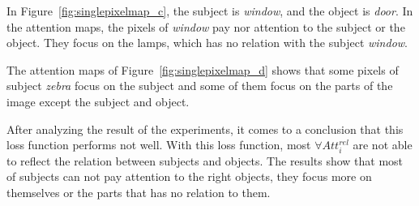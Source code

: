 In Figure~\ref{fig:singlepixelmap_c}, the subject is \textit{window}, and the object is \textit{door}. In the attention maps, the pixels of  \textit{window} pay nor attention to the subject or the object. They focus on the lamps, which has no relation with the subject \textit{window}.

The attention maps of Figure~\ref{fig:singlepixelmap_d} shows that some pixels of subject \textit{zebra} focus on the subject and some of them focus on the parts of the image except the subject and object.

After analyzing the result of the experiments, it comes to a conclusion that this loss function performs not well. With this loss function, most $ \forall Att_i^{rel} $ are not able to reflect the relation between subjects and objects. The results show that most of subjects can not pay attention to the right objects, they focus more on themselves or the parts that has no relation to them.



